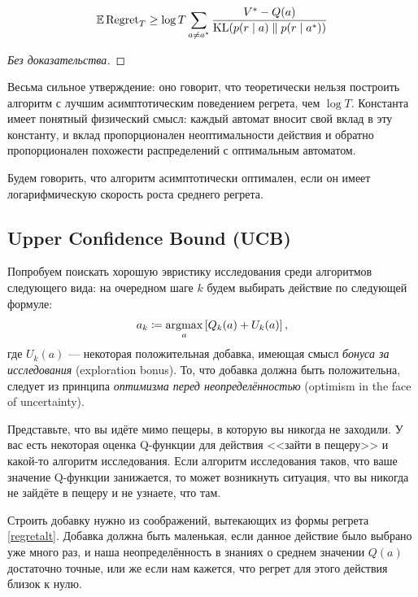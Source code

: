 \begin{theorem}
$$\mathbb{E} \operatorname{Regret}_T \ge \log T \sum_{a \ne a^*} \frac{V^* - Q(a)}{\operatorname{KL}(p(r \mid a) \parallel p(r \mid a^*))}$$
\begin{proof}[Без доказательства]
\end{proof}
\end{theorem}

Весьма сильное утверждение: оно говорит, что теоретически нельзя построить алгоритм с лучшим асимптотическим поведением регрета, чем $\log T$. Константа имеет понятный физический смысл: каждый автомат вносит свой вклад в эту константу, и вклад пропорционален неоптимальности действия и обратно пропорционален похожести распределений с оптимальным автоматом. 

Будем говорить, что алгоритм асимптотически оптимален, если он имеет логарифмическую скорость роста среднего регрета.

\subsection{Upper Confidence Bound (UCB)}\label{subsec:ucb}

Попробуем поискать хорошую эвристику исследования среди алгоритмов следующего вида: на очередном шаге $k$ будем выбирать действие по следующей формуле:
\begin{equation}\label{ucb_exploration}
a_k \coloneqq \mathop{\mathrm{argmax}}_a \left[ Q_k(a) + U_k(a) \right],
\end{equation}
где $U_k(a)$ --- некоторая положительная добавка, имеющая смысл \emph{бонуса за исследования} (exploration bonus). То, что добавка должна быть положительна, следует из принципа \emph{оптимизма перед неопределённостью} (optimism in the face of uncertainty).

\begin{example}
Представьте, что вы идёте мимо пещеры, в которую вы никогда не заходили. У вас есть некоторая оценка Q-функции для действия <<зайти в пещеру>> и какой-то алгоритм исследования. Если алгоритм исследования таков, что ваше значение Q-функции занижается, то может возникнуть ситуация, что вы никогда не зайдёте в пещеру и не узнаете, что там.
\end{example}

Строить добавку нужно из соображений, вытекающих из формы регрета \eqref{regretalt}. Добавка должна быть маленькая, если данное действие было выбрано уже много раз, и наша неопределённость в знаниях о среднем значении $Q(a)$ достаточно точные, или же если нам кажется, что регрет для этого действия близок к нулю.

